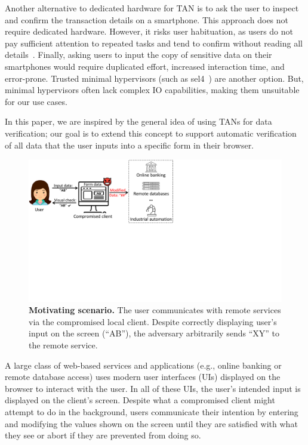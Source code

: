 Another alternative to dedicated hardware for TAN is to ask the user to inspect and confirm the transaction details on a smartphone.
This approach does not require dedicated hardware. However, it risks user habituation, as users do not pay sufficient attention to repeated tasks and tend to confirm without reading all details~\cite{userHabituation08}. Finally, asking users to input the copy of sensitive data on their smartphones would require duplicated effort, increased interaction time, and error-prone. Trusted minimal hypervisors (such as sel4~\cite{klein2009sel4}) are another option. But, minimal hypervisors often lack complex IO capabilities, making them unsuitable for our use cases.


In this paper, we are inspired by the general idea of using TANs for data verification; our goal is to extend this concept to support automatic verification of all data that the user inputs into a specific form in their browser.



\begin{figure}[t]
 \centering
 \includegraphics[trim={0 10.4cm 14.4cm 0},clip,width=\linewidth]{img/motivatingScenario.pdf}
\caption{\textbf{Motivating scenario.}
 	The user communicates with remote services via the compromised local client.
 	Despite correctly displaying user's input on the screen (``AB''), the adversary arbitrarily sends ``XY'' to the remote service.}
 \label{fig:scenario}
\end{figure}



A large class of web-based services and applications (e.g., online banking or remote database access) uses modern user interfaces (UIs) displayed on the browser to interact with the user. In all of these UIs, the user's intended input is displayed on the client's screen.
Despite what a compromised client might attempt to do in the background, users communicate their intention by entering and modifying the values shown on the screen until they are satisfied with what they see or abort if they are prevented from doing so.

